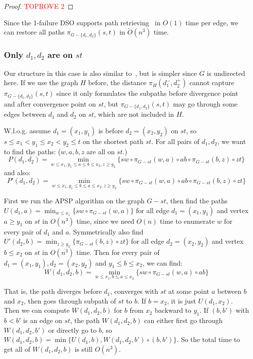 \documentclass[11pt]{article}
\theoremstyle{plain}
\theoremstyle{definition}
\newcommand{\set}[1]{\{ #1 \}}
\newcommand{\og}[3]{\pi_{G-#3}\left(#1,#2\right)}
\begin{document}
\begin{proof}\textcolor{red}{TOPROVE 2}\end{proof}
Since the 1-failure DSO supports path retrieving~\cite{Demetrescu2008, 2009A} in $O(1)$ time per edge, we can restore all paths $\og{s}{t}{\set{d_1, d_2}}$ in $\tilde{O}(n^3)$ time.


\subsubsection{Only $d_1,d_2$ are on $st$}\label{sec:two-2FRP}

Our structure in this case is also similar to~\cite{WWX22}, but is simpler since $G$ is undirected here. If we use the graph $H$ before, the distance $\pi_H(d_1^-,d_2^+)$ cannot capture $\og{s}{t}{\set{d_1, d_2}}$ since it only formulates the subpaths before divergence point and after convergence point on $st$, but $\og{s}{t}{\set{d_1, d_2}}$ may go through some edges between $d_1$ and $d_2$ on $st$, which are not included in $H$. 

W.l.o.g. assume $d_1=(x_1,y_1)$ is before $d_2=(x_2,y_2)$ on $st$, so $s\leq x_1<y_1\leq x_2<y_2\leq t$ on the shortest path $st$. For all pairs of $d_1,d_2$, we want to find the paths: ($w,a,b,z$ are all on $st$.)
$$P(d_1,d_2)=\min_{w\leq x_1, y_1\leq a\leq b\leq x_2, z\geq y_2} \{sw\circ \pi_{G-st}(w,a)\circ ab\circ \pi_{G-st}(b,z)\circ zt\}$$
and also:
$$P'(d_1,d_2)=\min_{w\leq x_1, y_1\leq b\leq a\leq x_2, z\geq y_2} \{sw\circ \pi_{G-st}(w,a)\circ ab\circ \pi_{G-st}(b,z)\circ zt\}$$

First we run the APSP algorithm on the graph $G-st$, then find the paths $U(d_1,a)=\min_{w\leq x_1}\{sw\circ \pi_{G-st}(w,a)\}$ for all edge $d_1=(x_1,y_1)$ and vertex $a\geq y_1$ on $st$ in $O(n^3)$ time, since we need $O(n)$ time to enumerate $w$ for every pair of $d_1$ and $a$. Symmetrically also find $U'(d_2,b)=\min_{z\geq y_2}\{\pi_{G-st}(b,z)\circ zt\}$ for all edge $d_2=(x_2,y_2)$ and vertex $b\leq x_2$ on $st$ in $O(n^3)$ time. Then for every pair of $d_1=(x_1,y_1),d_2=(x_2,y_2)$ and $y_1\leq b\leq x_2$, we can find:
$$W(d_1,d_2,b)=\min_{w\leq x_1, b\leq a\leq x_2} \{sw\circ \pi_{G-st}(w,a)\circ ab\}$$

That is, the path diverges before $d_1$, converges with $st$ at some point $a$ between $b$ and $x_2$, then goes through subpath of $st$ to $b$. If $b=x_2$, it is just $U(d_1,x_2)$. Then we can compute $W(d_1,d_2,b)$ for $b$ from $x_2$ backward to $y_1$. If $(b,b')$ with $b<b'$ is an edge on $st$, the path $W(d_1,d_2,b)$ can either first go through $W(d_1,d_2,b')$ or directly go to $b$, so $W(d_1,d_2,b)=\min\{U(d_1,b), W(d_1,d_2,b')\circ (b,b')\}$. So the total time to get all of $W(d_1,d_2,b)$ is still $O(n^3)$.
\end{document}
